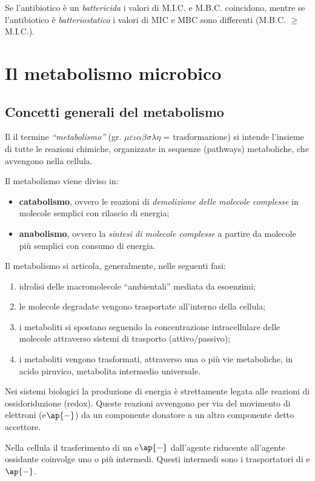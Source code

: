 \documentclass[11pt]{book}
\begin{document}
Se l’antibiotico è un \emph{battericida} i valori di M.I.C. e M.B.C. coincidono, mentre se l’antibiotico è \emph{batteriostatico} i valori di MIC e MBC sono differenti (M.B.C. $\ge$ M.I.C.).

\chapter{Il metabolismo microbico}
\section{Concetti generali del metabolismo}

Il il termine \emph{``metabolismo''} (gr. $\mu$$\varepsilon$$\iota$$\alpha$$\beta$$\sigma$$\lambda$$\eta$ = trasformazione) si intende l’insieme di tutte le reazioni chimiche, organizzate in sequenze (pathways) metaboliche, che avvengono nella cellula.

Il metabolismo viene diviso in:
\begin{itemize}
\item \textbf{catabolismo}, ovvero le reazioni di \emph{demolizione delle molecole complesse} in molecole semplici con rilascio di energia;
\item \textbf{anabolismo}, ovvero la \emph{sintesi di molecole complesse} a partire da molecole più semplici con consumo di energia.
\end{itemize}

Il metabolismo si articola, generalmente, nelle seguenti fasi: 
\begin{enumerate}
\item idrolisi delle macromolecole “ambientali” mediata da esoenzimi;
\item le molecole degradate vengono trasportate all’interno della cellula;
\item i metaboliti si spostano seguendo la concentrazione intracellulare delle molecole attraverso sistemi di trasporto (attivo/passivo);
\item i metaboliti vengono trasformati, attraverso una o più vie metaboliche, in acido piruvico, metabolita intermedio universale.
\end{enumerate}

Nei sistemi biologici la produzione di energia è strettamente legata alle reazioni di ossidoriduzione (redox). Queste reazioni avvengono per via del movimento di elettroni (e$\ap{-}$) da un componente donatore a un altro componente detto accettore. 

Nella cellula il trasferimento di un e$\ap{-}$ dall’agente riducente all’agente ossidante coinvolge uno o più intermedi. Questi intermedi sono i trasportatori di e$\ap{-}$.
\end{document}
